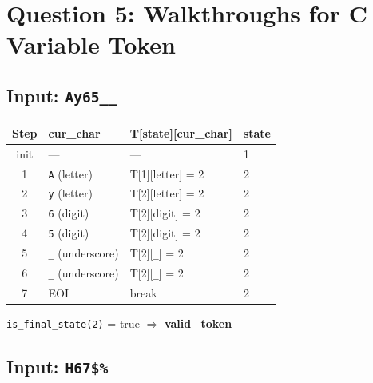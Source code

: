 \documentclass[a4paper,12pt]{article}
\begin{document}
\section{Question 5: Walkthroughs for C Variable Token}

\subsection*{Input: \texttt{Ay65\_\_}}

\begin{center}
\renewcommand{\arraystretch}{1.2}
\begin{tabular}{c|l|l|l}
\toprule
\textbf{Step} & \textbf{cur\_char} & \textbf{T[state][cur\_char]} & \textbf{state} \\
\midrule
init  & ---                       & ---                        & 1 \\
1     & \texttt{A} (letter)       & T[1][letter] = 2           & 2 \\
2     & \texttt{y} (letter)       & T[2][letter] = 2           & 2 \\
3     & \texttt{6} (digit)        & T[2][digit] = 2            & 2 \\
4     & \texttt{5} (digit)        & T[2][digit] = 2            & 2 \\
5     & \texttt{\_} (underscore)  & T[2][\texttt{\_}] = 2      & 2 \\
6     & \texttt{\_} (underscore)  & T[2][\texttt{\_}] = 2      & 2 \\
7     & EOI                       & break                       & 2 \\
\bottomrule
\end{tabular}
\end{center}
\texttt{is\_final\_state(2)} = true $\Rightarrow$ \textbf{valid\_token}

\subsection*{Input: \texttt{H67\$\%}}
\end{document}
